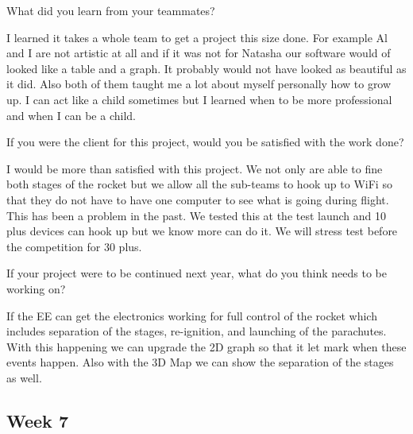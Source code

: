 \documentclass[10pt,draftclsnofoot,onecolumn]{IEEEtran}
\begin{document}
\begin{itemize}
	What did you learn from your teammates?

	I learned it takes a whole team to get a project this size done. For example Al and I are not artistic at all and if it was not for Natasha our software would of looked like a table and a graph. It probably would not have looked as beautiful as it did. Also both of them taught me a lot about myself personally how to grow up. I can act like a child sometimes but I learned when to be more professional and when I can be a child.

	If you were the client for this project, would you be satisfied with the work done?

	I would be more than satisfied with this project. We not only are able to fine both stages of the rocket but we allow all the sub-teams to hook up to WiFi so that they do not have to have one computer to see what is going during flight. This has been a problem in the past. We tested this at the test launch and 10 plus devices can hook up but we know more can do it. We will stress test before the competition for 30 plus.

	If your project were to be continued next year, what do you think needs to be working on?

	If the EE can get the electronics working for full control of the rocket which includes separation of the stages, re-ignition, and launching of the parachutes. With this happening we can upgrade the 2D graph so that it let mark when these events happen. Also with the 3D Map we can show the separation of the stages as well.
\end{itemize}


\subsection{Week 7}
\end{document}
